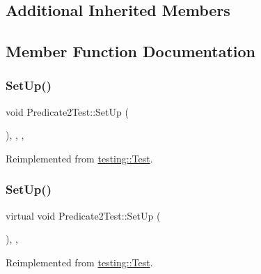 \subsection*{Additional Inherited Members}


\subsection{Member Function Documentation}
\mbox{\label{class_predicate2_test_a18b81bef55647028d072d59dea11055f}} 
\subsubsection{\texorpdfstring{SetUp()}{SetUp()}\hspace{0.1cm}{\footnotesize\ttfamily [1/3]}}
{\footnotesize\ttfamily void Predicate2\+Test\+::\+Set\+Up (\begin{DoxyParamCaption}{ }\end{DoxyParamCaption})\hspace{0.3cm}{\ttfamily [inline]}, {\ttfamily [override]}, {\ttfamily [protected]}, {\ttfamily [virtual]}}



Reimplemented from \mbox{\hyperlink{classtesting_1_1_test_a190315150c303ddf801313fd1a777733}{testing\+::\+Test}}.

\mbox{\label{class_predicate2_test_a9778563daf4846327d32061c1a8ccba0}} 
\subsubsection{\texorpdfstring{SetUp()}{SetUp()}\hspace{0.1cm}{\footnotesize\ttfamily [2/3]}}
{\footnotesize\ttfamily virtual void Predicate2\+Test\+::\+Set\+Up (\begin{DoxyParamCaption}{ }\end{DoxyParamCaption})\hspace{0.3cm}{\ttfamily [inline]}, {\ttfamily [protected]}, {\ttfamily [virtual]}}



Reimplemented from \mbox{\hyperlink{classtesting_1_1_test_a190315150c303ddf801313fd1a777733}{testing\+::\+Test}}.

